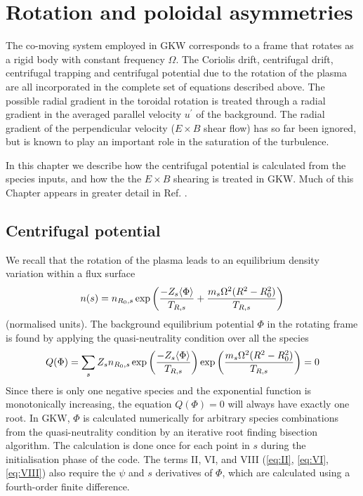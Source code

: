 \chapter{Rotation and poloidal asymmetries}

The co-moving system employed in GKW corresponds to a frame that rotates as a rigid body with constant frequency 
$\Omega$. The Coriolis drift, centrifugal drift, centrifugal trapping and centrifugal potential 
due to the rotation of the plasma are all incorporated in the complete set of equations described above. 
The possible radial gradient in the toroidal rotation is  treated through a radial gradient in the averaged parallel velocity $u^\prime$ 
of the background.  The radial gradient of the perpendicular velocity ($E \times B$ shear flow) has so far been ignored, 
but is known to play an important role in the saturation of the turbulence.  

In this chapter we describe how the centrifugal potential is calculated from the species inputs, 
and how the  the $E \times B$ shearing is treated in GKW.  Much of this Chapter appears in greater detail in Ref. \cite{Casson-Thesis}.





\section{Centrifugal potential\label{cfphi}}
We recall that the rotation of the plasma leads to an equilibrium density variation within a flux surface
\begin{equation}
  n(s)=n_{R_0,s} \exp\left({-Z_s \langle\Phi\rangle\over T_{R,s}}+{m_s\Omega^2(R^2-R_0^2)\over T_{R,s}}\right) 
\end{equation}
(normalised units). The background equilibrium potential $\Phi$ in the rotating frame is found by applying the quasi-neutrality condition over all the species
\begin{equation}
  Q(\Phi)=\sum_s Z_s n_{R_0,s} \exp\left({-Z_s \langle\Phi\rangle\over T_{R,s}}\right)\exp\left({m_s\Omega^2(R^2-R_0^2)\over T_{R,s}}\right)=0
  \label{eq:cf-quasineutral}
\end{equation}
Since there is only one negative species and the exponential function is monotonically increasing, the equation $Q(\Phi)=0$ will always have exactly one root.  
In GKW, $\Phi$ is calculated numerically for arbitrary species combinations from the quasi-neutrality condition by an iterative root finding bisection algorithm.  The calculation is done once for each point in $s$ during the initialisation phase of the code. 
The terms II, VI, and VIII (\ref{eq:II}, \ref{eq:VI}, \ref{eq:VIII}) also require the $\psi$ and $s$ derivatives of $\Phi$, which are calculated using a fourth-order finite difference.

